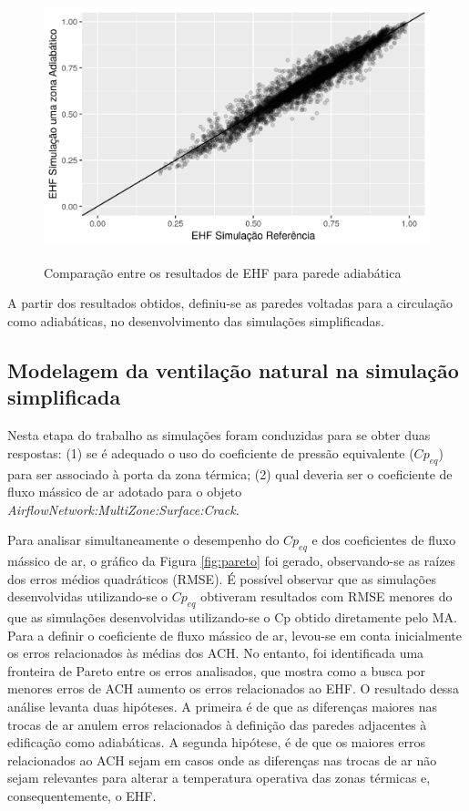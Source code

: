 \documentclass[brazil,hardcopy,openany,a4paper]{ufscthesis}
\begin{document}
		\begin{figure}[H]
			\centering
			\caption{Comparação entre os resultados de EHF para parede adiabática}
			\includegraphics[width=1\linewidth]{img/szadi_EHF_scatter.png}
			\label{fig:szadi_EHF}
		\end{figure}
		
		A partir dos resultados obtidos, definiu-se as paredes voltadas para a circulação como adiabáticas, no desenvolvimento das simulações simplificadas.
		
	\subsection{Modelagem da ventilação natural na simulação simplificada}
	
	Nesta etapa do trabalho as simulações foram conduzidas para se obter duas respostas:
	(1) se é adequado o uso do coeficiente de pressão equivalente ($Cp_{eq}$) para ser associado à porta da zona térmica; (2) qual deveria ser o coeficiente de fluxo mássico de ar adotado para o objeto \textit{AirflowNetwork:MultiZone:Surface:Crack}.
	
	Para analisar simultaneamente o desempenho do $Cp_{eq}$ e dos coeficientes de fluxo mássico de ar, o gráfico da Figura \ref{fig:pareto} foi gerado, observando-se as raízes dos erros médios quadráticos (RMSE).
	É possível observar que as simulações desenvolvidas utilizando-se o $Cp_{eq}$ obtiveram resultados com RMSE menores do que as simulações desenvolvidas utilizando-se o Cp obtido diretamente pelo MA.
	Para a definir o coeficiente de fluxo mássico de ar, levou-se em conta inicialmente os erros relacionados às médias dos ACH.
	No entanto, foi identificada uma fronteira de Pareto entre os erros analisados, que mostra como a busca por menores erros de ACH aumento os erros relacionados ao EHF.
	O resultado dessa análise levanta duas hipóteses. A primeira é de que as diferenças maiores nas trocas de ar anulem erros relacionados à definição das paredes adjacentes à edificação como adiabáticas. A segunda hipótese, é de que os maiores erros relacionados ao ACH sejam em casos onde as diferenças nas trocas de ar não sejam relevantes para alterar a temperatura operativa das zonas térmicas e, consequentemente, o EHF.
	
\end{document}
